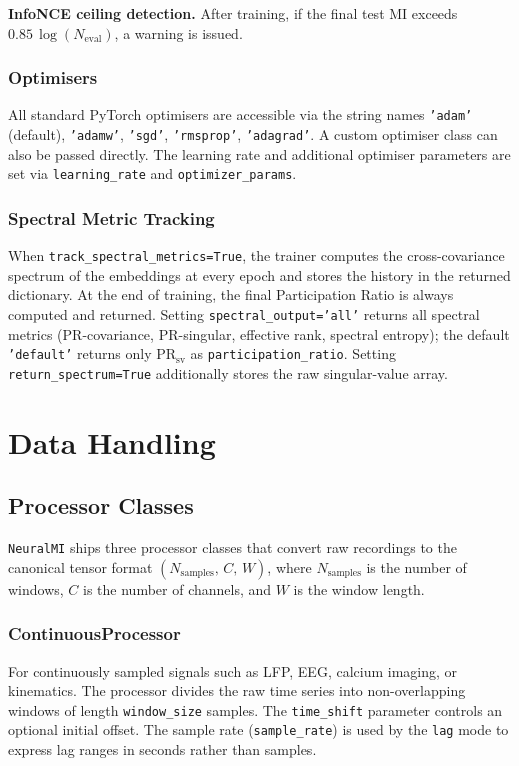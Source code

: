 \documentclass[12pt]{article}
\newcommand{\nmi}{\texttt{NeuralMI}}
\newcommand{\api}[1]{\texttt{#1}}
\begin{document}
\textbf{InfoNCE ceiling detection.}  After training, if the final test MI
exceeds $0.85\,\log(N_{\mathrm{eval}})$, a warning is issued.

\subsubsection{Optimisers}

All standard PyTorch optimisers are accessible via the string names
\api{'adam'} (default), \api{'adamw'}, \api{'sgd'}, \api{'rmsprop'},
\api{'adagrad'}.  A custom optimiser class can also be passed directly.
The learning rate and additional optimiser parameters are set via
\api{learning\_rate} and \api{optimizer\_params}.

\subsubsection{Spectral Metric Tracking}

When \api{track\_spectral\_metrics=True}, the trainer computes the
cross-covariance spectrum of the embeddings at every epoch and stores the
history in the returned dictionary.  At the end of training, the final
Participation Ratio is always computed and returned.  Setting
\api{spectral\_output='all'} returns all spectral metrics
(PR-covariance, PR-singular, effective rank, spectral entropy);
the default \api{'default'} returns only $\mathrm{PR}_{\mathrm{sv}}$ as
\api{participation\_ratio}.  Setting \api{return\_spectrum=True}
additionally stores the raw singular-value array.

\section{Data Handling}
\label{sec:data}

\subsection{Processor Classes}
\label{sec:data:processors}

\nmi{} ships three processor classes that convert raw recordings to the
canonical tensor format $(N_{\mathrm{samples}},\,C,\,W)$, where
$N_{\mathrm{samples}}$ is the number of windows, $C$ is the number of
channels, and $W$ is the window length.

\subsubsection{ContinuousProcessor}
For continuously sampled signals such as LFP, EEG, calcium imaging, or
kinematics.  The processor divides the raw time series into non-overlapping
windows of length \api{window\_size} samples.  The \api{time\_shift}
parameter controls an optional initial offset.  The sample rate
(\api{sample\_rate}) is used by the \api{lag} mode to express lag ranges
in seconds rather than samples.
\end{document}
